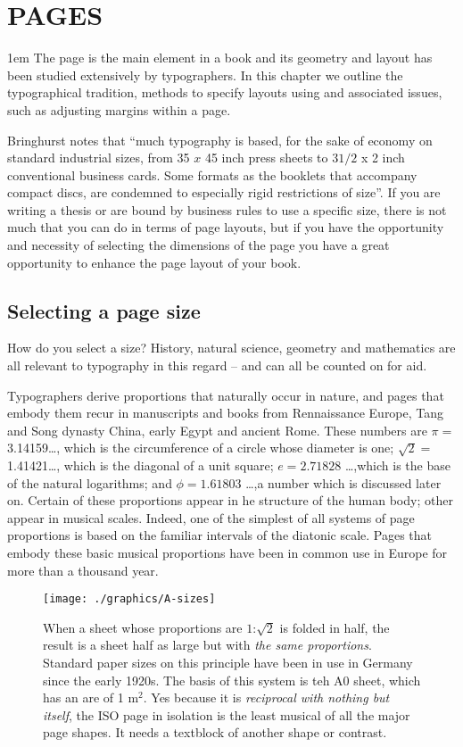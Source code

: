 \chapter{PAGES}

\parindent1em
The page is the main element in a book and its geometry and layout has been studied extensively by typographers. In this chapter we outline the typographical tradition, methods to specify layouts using \latex and associated issues, such as adjusting margins within a page.

Bringhurst notes that ``much typography is based, for the sake of economy on standard industrial sizes, from 35 $x$ 45 inch press sheets to $3 1/2$ x 2 inch conventional business cards. Some formats as the booklets that accompany compact discs, are condemned to especially rigid restrictions of size''.  If you are writing a thesis or are bound by business rules to use a specific size, there is not much that you can do in terms of page layouts, but if you have the opportunity and necessity of selecting the dimensions of the page you have a great opportunity to enhance the page layout of your book.

\section{Selecting a page size}

How do you select a size? History, natural science, geometry and mathematics
are all relevant to typography in this regard -- and can all be counted on for aid.

Typographers derive proportions that naturally occur in nature, and pages that embody
them recur in manuscripts and books from Rennaissance Europe, Tang and Song dynasty
China, early Egypt and ancient Rome.  
These numbers are $\pi=$3.14159\ldots , which is the circumference of a circle whose diameter
is one; $\sqrt{2}=$1.41421\ldots , which is the diagonal of a unit square; 
$e=2.71828$  \ldots ,which is the base of the natural logarithms; and $\phi=1.61803$ \ldots ,a number which is discussed later on. Certain of these proportions appear in he structure of the human body; other appear in musical scales. Indeed, one of the simplest of all systems of 
page proportions is based on the familiar intervals of the diatonic scale. Pages that
embody these basic musical proportions have been in common use in Europe for more than a thousand year.

\begin{figure}
  \texttt{[image: ./graphics/A-sizes]}
  \caption{\large When a sheet whose proportions are $1$:$\surd{2}$ is folded in half, the result is a sheet half as large but with \emph{the same proportions}. Standard paper sizes on this principle have been in use in Germany since the early 1920s. The basis of this system is teh A0 sheet, which has an are of 1 m$^2$. Yes because it is \textit{reciprocal with nothing but itself}, the ISO page in isolation is the least musical of all the major page shapes. It needs a textblock of another shape or contrast.}
   \label{fig:marginfig1}
\end{figure}

